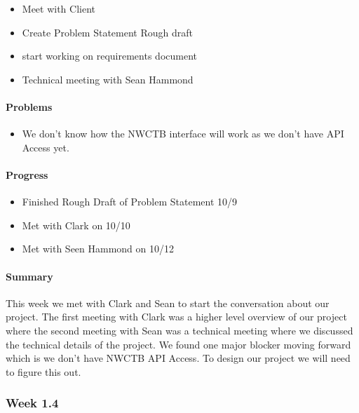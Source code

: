 \documentclass[onecolumn, draftclsnofoot,10pt, compsoc]{article}
\begin{document}
		        \begin{itemize}
		            \item Meet with Client
		            \item Create Problem Statement Rough draft
		            \item start working on requirements document
		            \item Technical meeting with Sean Hammond
		        \end{itemize}
		        
		    \paragraph{Problems} \hfill \break
		    
		    \begin{itemize}
		        \item We don't know how the NWCTB interface will work as we don't have API Access yet.
		    \end{itemize}
		
		    \paragraph{Progress} \hfill \break

		    \begin{itemize}
		        \item Finished Rough Draft of Problem Statement 10/9
		        \item Met with Clark on 10/10
		        \item Met with Seen Hammond on 10/12
		    \end{itemize}
		    
		    \paragraph{Summary} \hfill \break
		    	This week we met with Clark and Sean to start the conversation about our project. The first meeting with Clark was a higher level overview of our project where the second meeting with Sean was a technical meeting where we discussed the technical details of the project. We found one major blocker moving forward which is we don't have NWCTB API Access. To design our project we will need to figure this out.\\ 
		        
		\subsubsection{Week 1.4}
		
\end{document}
